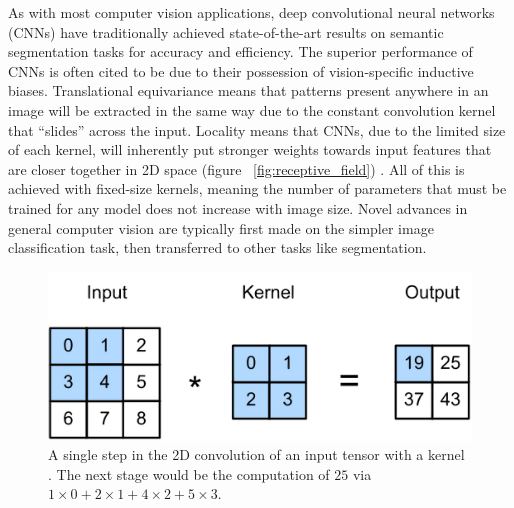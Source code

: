 \documentclass[a4paper,12pt]{report}
\begin{document}
As with most computer vision applications, deep convolutional neural networks (CNNs) have traditionally achieved state-of-the-art results on semantic segmentation tasks for accuracy and efficiency. The superior performance of CNNs is often cited to be due to their possession of vision-specific inductive biases. Translational equivariance means that patterns present anywhere in an image will be extracted in the same way due to the constant convolution kernel that “slides” across the input. Locality means that CNNs, due to the limited size of each kernel, will inherently put stronger weights towards input features that are closer together in 2D space (figure ~\ref{fig:receptive_field}) \cite{zhang_dive_2019}. All of this is achieved with fixed-size kernels, meaning the number of parameters that must be trained for any model does not increase with image size. Novel advances in general computer vision are typically first made on the simpler image classification task, then transferred to other tasks like segmentation.


\begin{figure}[ht]
    \centering
    \includegraphics[scale=0.7]{res/convolution.png}
    \caption{A single step in the 2D convolution of an input tensor with a kernel \cite{zhang_dive_2019}. The next stage would be the computation of $25$ via $1 \times 0 + 2 \times 1 + 4 \times 2 + 5 \times 3$.}
    \label{fig:convolution}
\end{figure}
\end{document}
